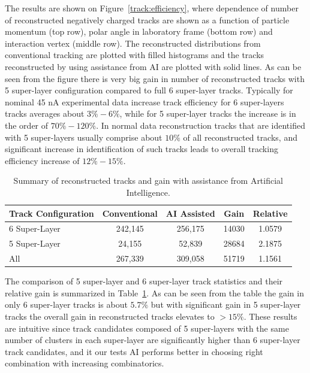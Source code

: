 The results are shown on Figure~\ref{track:efficiency}, where dependence of number of reconstructed negatively charged 
 tracks are shown as a function of particle momentum (top row), polar angle in laboratory frame (bottom row) and interaction
 vertex (middle row). The reconstructed distributions from conventional tracking are plotted with filled histograms and the
 tracks reconstructed by using assistance from AI are plotted with solid lines. As can be seen from the figure there is very big gain 
 in number of reconstructed tracks with 5 super-layer configuration compared to full 6 super-layer tracks. Typically for nominal 
 45 nA experimental data increase track efficiency for 6 super-layers tracks averages about $3\%-6\%$, while for 5 super-layer
 tracks the increase is in the order of $70\%-120\%$. In normal data reconstruction tracks that are identified with 5 super-layers
 usually comprise about $10\%$ of all reconstructed tracks, and significant increase in identification of such tracks leads to 
 overall tracking efficiency increase of $12\%-15\%$. 
 
 \begin{table}[!h]
 \begin{center}
 \begin{tabular}{|l|c|c|c|c|}
 \hline
 Track Configuration & Conventional & AI Assisted & Gain & Relative \\
 \hline
 \hline
 6 Super-Layer & 242,145 & 256,175 & 14030 & 1.0579 \\
 5 Super-Layer & 24,155 & 52,839 & 28684 & 2.1875 \\
 All & 267,339 & 309,058 & 51719 & 1.1561 \\
 \hline
 \end{tabular}
 \end{center}
 \caption{Summary of reconstructed tracks and gain with assistance from Artificial Intelligence.}
 \label{tbl:summary}
 \end{table}
 
The comparison of 5 super-layer and 6 super-layer track statistics and their relative gain is summarized in Table~\ref{tbl:summary}.
As can be seen from the table the gain in only 6 super-layer tracks is about $5.7\%$ but with significant gain in 5 super-layer tracks 
the overall gain in reconstructed tracks elevates to $>15\%$. These results are intuitive since track candidates composed of 5
super-layers with the same number of clusters in each super-layer are significantly higher than 6 super-layer track candidates, and 
it our tests AI performs better in choosing right combination with increasing combinatorics.
 
